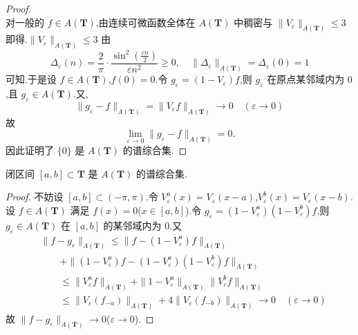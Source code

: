 \begin{proof}
\begin{equation*}
\end{equation*}
对一般的 $f \in A(\mathbf{T})$,由连续可微函数全体在 $A(\mathbf{T})$ 中稠密与 $\|V_{\varepsilon}\|_{A(\mathbf{T})} \leq 3$ 即得.$\|V_{\varepsilon}\|_{A(\mathbf{T})} \leq 3$ 由
\begin{equation*}
\widehat{\Delta_{\varepsilon}}(n) = \frac{2}{\pi} \cdot \frac{\sin^{2}\left(\frac{\varepsilon n}{2}\right)}{\varepsilon n^{2}} \geq 0, \quad \|\Delta_{\varepsilon}\|_{A(\mathbf{T})} = \Delta_{\varepsilon}(0) = 1
\end{equation*}
可知.于是设 $f \in A(\mathbf{T})$,$f(0) = 0$.令 $g_{\varepsilon} = (1 - V_{\varepsilon})f$,则 $g_{\varepsilon}$ 在原点某邻域内为 $0$,且 $g_{\varepsilon} \in A(\mathbf{T})$.又,
\begin{equation*}
\|g_{\varepsilon} - f\|_{A(\mathbf{T})} = \|V_{\varepsilon}f\|_{A(\mathbf{T})} \to 0 \quad (\varepsilon \to 0)
\end{equation*}
故
\begin{equation*}
\lim_{\varepsilon \to 0}\|g_{\varepsilon} - f\|_{A(\mathbf{T})} = 0.
\end{equation*}
因此证明了 $\{0\}$ 是 $A(\mathbf{T})$ 的谱综合集.
\end{proof}

\begin{corollary}\label{cor:3.3.2}
闭区间 $[a, b] \subset \mathbf{T}$ 是 $A(\mathbf{T})$ 的谱综合集.
\end{corollary}

\begin{proof}
不妨设 $[a, b] \subset (-\pi, \pi)$.令 $V_{\varepsilon}^{a}(x) = V_{\varepsilon}(x - a)$,$V_{\varepsilon}^{b}(x) = V_{\varepsilon}(x - b)$.设 $f \in A(\mathbf{T})$ 满足 $f(x) = 0$($x \in [a, b]$).令 $g_{\varepsilon} = (1 - V_{\varepsilon}^{a})(1 - V_{\varepsilon}^{b})f$,则 $g_{\varepsilon} \in A(\mathbf{T})$ 在 $[a, b]$ 的某邻域内为 $0$.又
\begin{align*}
& \|f - g_{\varepsilon}\|_{A(\mathbf{T})} \leq \|f - (1 - V_{\varepsilon}^{a})f\|_{A(\mathbf{T})} \\
& \qquad + \|(1 - V_{\varepsilon}^{a})f - (1 - V_{\varepsilon}^{a})(1 - V_{\varepsilon}^{b})f\|_{A(\mathbf{T})} \\
& \qquad \leq \|V_{\varepsilon}^{a}f\|_{A(\mathbf{T})} + \|1 - V_{\varepsilon}^{a}\|_{A(\mathbf{T})}\|V_{\varepsilon}^{b}f\|_{A(\mathbf{T})} \\
& \qquad \leq \|V_{\varepsilon}(f_{-a})\|_{A(\mathbf{T})} + 4\|V_{\varepsilon}(f_{-b})\|_{A(\mathbf{T})} \to 0 \quad (\varepsilon \to 0)
\end{align*}
故 $\|f - g_{\varepsilon}\|_{A(\mathbf{T})} \to 0$($\varepsilon \to 0$).
\end{proof}


